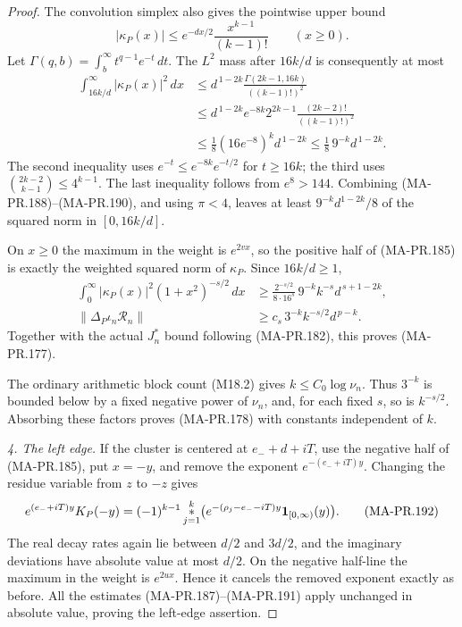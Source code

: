 \begin{proof}
The convolution simplex also gives the pointwise
upper bound
\[
       |\kappa_P(x)|
          \le e^{-dx/2}\frac{x^{k-1}}{(k-1)!}
                         \qquad(x\ge0).
 \tag{MA-PR.189}
\]
Let \(\Gamma(q,b)=\int_b^\infty t^{q-1}e^{-t}\,dt\).
The \(L^2\) mass after \(16k/d\) is consequently at most
\[
 \begin{split}
 \int_{16k/d}^\infty|\kappa_P(x)|^2\,dx
 &\le d^{\,1-2k}
                  \frac{\Gamma(2k-1,16k)}{((k-1)!)^2}\\
 &\le d^{\,1-2k}e^{-8k}
             2^{2k-1}\frac{(2k-2)!}{((k-1)!)^2}\\
 &\le \frac18(16e^{-8})^k d^{\,1-2k}
 \le \frac18\,9^{-k}d^{\,1-2k}.
 \end{split}
 \tag{MA-PR.190}
\]
The second inequality uses \(e^{-t}\le
e^{-8k}e^{-t/2}\) for \(t\ge16k\); the third uses
\(\binom{2k-2}{k-1}\le4^{k-1}\).
The last inequality follows from \(e^8>144\).
Combining (MA-PR.188)--(MA-PR.190), and using
\(\pi<4\), leaves at least
\(9^{-k}d^{1-2k}/8\) of the squared norm in
\([0,16k/d]\).

On \(x\ge0\) the maximum in the weight is
\(e^{2vx}\), so the positive half of
(MA-PR.185) is exactly the weighted squared
norm of \(\kappa_P\).  Since \(16k/d\ge1\),
\[
 \begin{split}
 \int_0^\infty
       |\kappa_P(x)|^2(1+x^2)^{-s/2}\,dx
 &\ge \frac{2^{-s/2}}{8\cdot16^s}\,
            9^{-k}k^{-s}d^{\,s+1-2k},\\
 \|\Delta_P\iota_n\mathscr R_n\|
 &\ge c_s\,3^{-k}k^{-s/2}d^{\,p-k}.
 \end{split}
 \tag{MA-PR.191}
\]
Together with the actual \(J_n^*\) bound following
(MA-PR.182), this proves (MA-PR.177).

The ordinary arithmetic block count (M18.2) gives
\(k\le C_0\log\nu_n\).  Thus \(3^{-k}\) is
bounded below by a fixed negative power of
\(\nu_n\), and, for each fixed \(s\), so is
\(k^{-s/2}\).  Absorbing these factors proves
(MA-PR.178) with constants independent of \(k\).

\emph{4. The left edge.}
If the cluster is centered at \(e_-+d+iT\), use
the negative half of (MA-PR.185), put \(x=-y\),
and remove the exponent \(e^{-(e_-+iT)y}\).
Changing the residue variable from \(z\) to \(-z\)
gives
\[
 e^{(e_-+iT)y}K_P(-y)
   =(-1)^{k-1}
      \mathop{*}_{j=1}^k
       \bigl(e^{-(\rho_j-e_--iT)y}
                         {\bf1}_{[0,\infty)}(y)\bigr).
 \tag{MA-PR.192}
\]
The real decay rates again lie between \(d/2\)
and \(3d/2\), and the imaginary deviations have
absolute value at most \(d/2\).  On the negative
half-line the maximum in the weight is
\(e^{2ux}\).  Hence it cancels the removed
exponent exactly as before.  All the estimates
(MA-PR.187)--(MA-PR.191) apply unchanged in
absolute value, proving the left-edge assertion.


\end{proof}
